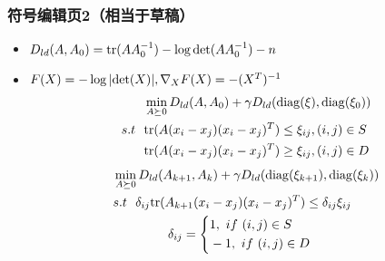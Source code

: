 \documentclass{beamer}
\begin{document}
\begin{frame}\frametitle{符号编辑页2（相当于草稿）}
\begin{itemize}
\item $D_{ld}(A,A_0)={\rm tr}(AA_{0}^{-1})-\log{\rm det}(AA_{0}^{-1})-n$
\item $F(X)=-\log|{\rm det}(X)|,\nabla_{X}F(X)=-(X^{T})^{-1}$
\begin{equation}
\begin{split}
&\min_{A\succeq 0}D_{ld}(A,A_0)+\gamma D_{ld}({\rm diag}(\xi),{\rm diag}(\xi_0))\\
s.t~~&{\rm tr}(A(x_{i}-x_{j})(x_{i}-x_{j})^{T})\leq \xi_{ij},(i,j)\in S\\
&{\rm tr}(A(x_{i}-x_{j})(x_{i}-x_{j})^{T})\geq \xi_{ij},(i,j)\in D\\
\end{split}
\end{equation}
\begin{equation}
\begin{split}
&\min_{A\succeq 0}D_{ld}(A_{k+1},A_{k})+\gamma D_{ld}({\rm diag}(\xi_{k+1}),{\rm diag}(\xi_k))\\
&s.t~~\delta_{ij}{\rm tr}(A_{k+1}(x_{i}-x_{j})(x_{i}-x_{j})^{T})\leq \delta_{ij}\xi_{ij}\\
&~~~~~~~~~~~~~\delta_{ij}=\left\{
\begin{split}
&1,~if~ (i,j)\in S\\
&-1,~if~ (i,j)\in D\\
\end{split}
\right.
\end{split}
\end{equation}
\end{itemize}
\end{frame}
\end{document}
